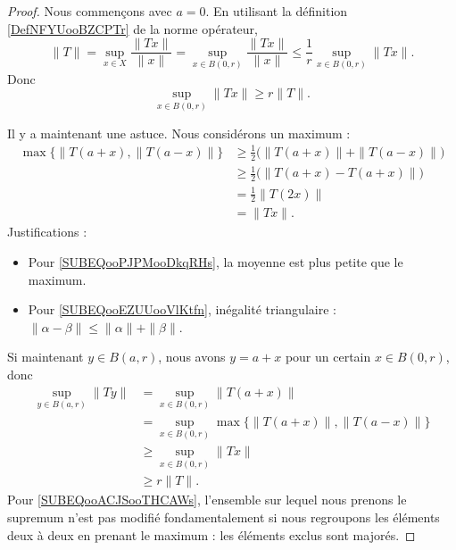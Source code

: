 \begin{proof}
	Nous commençons avec \( a=0\). En utilisant la définition \ref{DefNFYUooBZCPTr} de la norme opérateur,
	\begin{equation}
		\| T \|=\sup_{x\in X}\frac{ \| Tx \| }{ \| x \| }=\sup_{x\in B(0,r)}\frac{ \| Tx \| }{ \| x \| }\leq \frac{1}{ r }\sup_{x\in B(0,r)}\| Tx \|.
	\end{equation}
	Donc
	\begin{equation}
		\sup_{x\in B(0,r)}\| Tx \|\geq r\| T \|.
	\end{equation}

	Il y a maintenant une astuce. Nous considérons un maximum :
	\begin{subequations}
		\begin{align}
			\max\{ \| T(a+x),\| T(a-x) \|  \} & \geq \frac{ 1 }{2}\big( \| T(a+x) \|+\| T(a-x) \| \big) \label{SUBEQooPJPMooDkqRHs} \\
			                                    & \geq \frac{ 1 }{2}\big( \| T(a+x)-T(a+x) \| \big)      \label{SUBEQooEZUUooVlKtfn}  \\
			                                    & =\frac{ 1 }{2}\| T(2x) \|                                                           \\
			                                    & =\| Tx \|.
		\end{align}
	\end{subequations}
	Justifications :
	\begin{itemize}
		\item Pour \eqref{SUBEQooPJPMooDkqRHs}, la moyenne est plus petite que le maximum.
		\item Pour \eqref{SUBEQooEZUUooVlKtfn}, inégalité triangulaire : \( \| \alpha-\beta \|\leq \| \alpha \|+\| \beta \|\).
	\end{itemize}
	Si maintenant \( y\in B(a,r)\), nous avons \( y=a+x\) pour un certain \( x\in B(0,r)\), donc
	\begin{subequations}
		\begin{align}
			\sup_{y\in B(a,r)}\| Ty \| & =\sup_{x\in B(0,r)}\| T(a+x) \|                                                            \\
			                           & =\sup_{x\in B(0,r)}\max\{ \| T(a+x) \|, \| T(a-x) \| \}        \label{SUBEQooACJSooTHCAWs} \\
			                           & \geq \sup_{x\in B(0,r)}\| Tx \|                                                            \\
			                           & \geq r\| T \|.
		\end{align}
	\end{subequations}
	Pour \eqref{SUBEQooACJSooTHCAWs}, l'ensemble sur lequel nous prenons le supremum n'est pas modifié fondamentalement si nous regroupons les éléments deux à deux en prenant le maximum : les éléments exclus sont majorés.
\end{proof}

